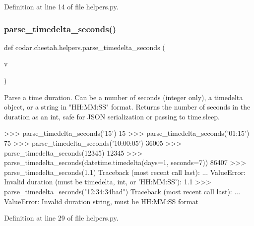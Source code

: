 Definition at line 14 of file helpers.\+py.

\mbox{\label{namespacecodar_1_1cheetah_1_1helpers_aefd230bdcbba1681b70244f39310b68b}} 
\subsubsection{\texorpdfstring{parse\+\_\+timedelta\+\_\+seconds()}{parse\_timedelta\_seconds()}}
{\footnotesize\ttfamily def codar.\+cheetah.\+helpers.\+parse\+\_\+timedelta\+\_\+seconds (\begin{DoxyParamCaption}\item[{}]{v }\end{DoxyParamCaption})}

\begin{DoxyVerb}Parse a time duration. Can be a number of seconds (integer only),
a timedelta object, or a string in "HH:MM:SS" format. Returns the number
of seconds in the duration as an int, safe for JSON serialization or
passing to time.sleep.

>>> parse_timedelta_seconds('15')
15
>>> parse_timedelta_seconds('01:15')
75
>>> parse_timedelta_seconds('10:00:05')
36005
>>> parse_timedelta_seconds(12345)
12345
>>> parse_timedelta_seconds(datetime.timedelta(days=1, seconds=7))
86407
>>> parse_timedelta_seconds(1.1)
Traceback (most recent call last):
    ...
ValueError: Invalid duration (must be timedelta, int, or 'HH:MM:SS'): 1.1
>>> parse_timedelta_seconds("12:34:34bad")
Traceback (most recent call last):
    ...
ValueError: Invalid duration string, must be HH:MM:SS format
\end{DoxyVerb}
 

Definition at line 29 of file helpers.\+py.

\mbox{\label{namespacecodar_1_1cheetah_1_1helpers_a23099409c04805468db73bd84ee21cb3}} 
